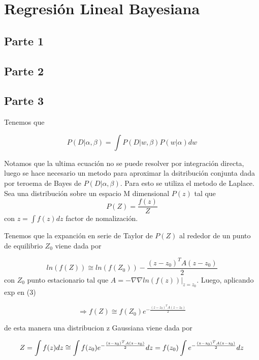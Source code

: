 \section{Regresión Lineal Bayesiana}
\subsection{Parte 1}
\subsection{Parte 2}
\subsection{Parte 3}
Tenemos que

\begin{equation}
    P(D|\alpha,\beta)=\int  P(D|w,\beta)P(w|\alpha)dw
\end{equation}

Notamos que la ultima ecuación no se puede resolver por integración  directa, luego se hace necesario un metodo para aproximar la dsitribución conjunta dada por teroema de Bayes de $ P(D|\alpha,\beta)$. Para esto se utiliza el metodo de Laplace. Sea una distribución sobre un espacio M dimensional $P(z)$ tal que
\begin{equation}
    P(Z)=\frac{f(z)}{Z}
\end{equation}
con $z=\int f(z) dz$ factor de nomalización. 

Tenemos que la expanción en serie de Taylor de $P(Z)$ al rededor de un punto de equilibrio $Z_{0}$ viene dada por


\begin{equation}
  ln (f(Z))\cong ln( f(Z_{0}))-\frac{(z-z_{0})^{T}A(z-z_{0})}{2}
\end{equation}
con $Z_{0}$ punto estacionario tal que $A=-\nabla \nabla ln(f(z))|_{z=z_{0}} $. Luego, aplicando exp en (3)

\begin{equation}
    \Rightarrow{f(Z)\cong  f(Z_{0})e^{-\frac{(z-z_{0})^{T}A(z-z_{0})}{2}}}
\end{equation}

de esta manera una distribucion z Gaussiana viene dada por

\begin{equation}
    Z=\int f(z) dz\cong \int f(z_{0})e^{-\frac{(z-z_{0})^{T}A(z-z_{0})}{2}} dz \\
    =f(z_{0})\int e^{-\frac{(z-z_{0})^{T}A(z-z_{0})}{2}} dz 
    
\end{equation}

